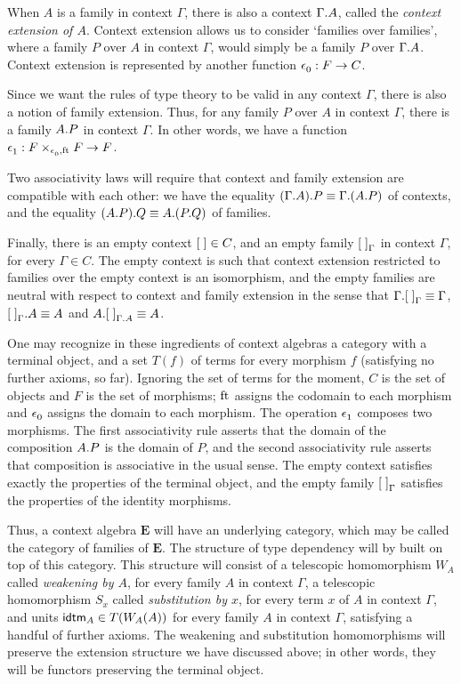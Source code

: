 When $A$ is a family in context $\Gamma$, there is also a context $\ctxext{\Gamma}{A}$,
called the \emph{context extension of $A$}. Context extension allows us to consider
`families over families', where a family $P$ over $A$ in context $\Gamma$, would
simply be a family $P$ over $\ctxext{\Gamma}{A}$. Context extension is represented
by another function $\epsilon_{0}^{} : F\to C$.

Since we want the rules of
type theory to be valid in any context $\Gamma$, there is also a notion of family
extension. Thus, for any family $P$ over $A$ in context $\Gamma$, there is a
family $\ctxext{A}{P}$ in context $\Gamma$. In other words, we have a function
$\epsilon_{1}^{} : F\times_{\epsilon_{0}^{},\mathrm{ft}_{}} F\to F$. 

Two associativity laws will require
that context and family extension are compatible with each other: we have
the equality $\ctxext{{\Gamma}{A}}{P}\jdeq\ctxext{\Gamma}{{A}{P}}$ of contexts,
and the equality $\ctxext{{A}{P}}{Q}\jdeq\ctxext{A}{{P}{Q}}$ of families.

Finally, there is an empty context ${[\;]}\in C$, and an empty family ${[\;]}_{\Gamma}$
in context $\Gamma$, for every $\Gamma\in C$. The empty context is such that context extension
restricted to families over the empty context is an isomorphism, and the empty
families are neutral with respect to context and family extension in the sense
that $\ctxext{\Gamma}{\emptyf[\Gamma]}\jdeq\Gamma$, $\ctxext{\emptyf[\Gamma]}{A}
\jdeq A$ and $\ctxext{A}{\emptyf[\ctxext{\Gamma}{A}]}\jdeq A$. 

One may recognize in these ingredients of context algebras a category with a
terminal object, and a set $T(f)$ of terms for every morphism $f$ (satisfying
no further axioms, so far). Ignoring the set of terms for the moment, $C$ is
the set of objects and $F$ is the set of morphisms; $\mathrm{ft}_{}$ assigns the codomain
to each morphism and $\epsilon_{0}^{}$ assigns the domain to each  morphism. The
operation $\epsilon_{1}^{}$ composes two morphisms. The first associativity rule
asserts that the domain of the composition $\ctxext{A}{P}$ is the domain of
$P$, and the second associativity rule asserts that composition is associative
in the usual sense. The empty context satisfies exactly the properties of the
terminal object, and the empty family ${[\;]}_{\Gamma}$ satisfies the properties
of the identity morphisms. 

Thus, a context algebra $\mathbf{E}$ will have an underlying category, which may be called the
category of families of $\mathbf{E}$. The structure of type dependency will by
built on top of this category. This structure will consist of a telescopic homomorphism
$W_A$ called \emph{weakening by $A$}, for every family $A$ in context $\Gamma$,
a telescopic homomorphism $S_x$ called \emph{substitution by $x$}, for every term
$x$ of $A$ in context $\Gamma$, and units $\idtm{A}\in T(W_A(A))$ for every
family $A$ in context $\Gamma$, satisfying a handful of further axioms. 
The weakening and substitution homomorphisms
will preserve the extension structure we have discussed above; in other words,
they will be functors preserving the terminal object.

